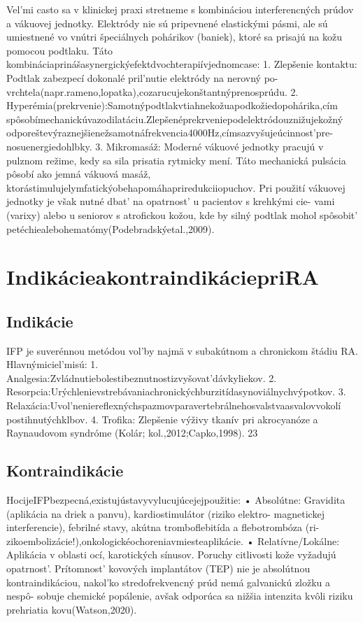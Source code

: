 Vel’mi casto sa v klinickej praxi stretneme s kombináciou interferencných prúdov a vákuovej jednotky. Elektródy nie sú pripevnené elastickými pásmi, ale sú umiestnené vo vnútri špeciálnych pohárikov (baniek), ktoré sa prisajú na kožu pomocou podtlaku. Táto kombináciaprinášasynergickýefektdvochterapiívjednomcase: 1. Zlepšenie kontaktu: Podtlak zabezpecí dokonalé pril’nutie elektródy na nerovný po- vrchtela(napr.rameno,lopatka),cozarucujekonštantnýprenosprúdu. 2. Hyperémia(prekrvenie):Samotnýpodtlakvtiahnekožuapodkožiedopohárika,cím spôsobímechanickúvazodilatáciu.Zlepšenéprekrveniepodelektródouznižujekožný odporeštevýraznejšienežsamotnáfrekvencia4000Hz,címsazvyšujeúcinnost’pre- nosuenergiedohlbky. 3. Mikromasáž: Moderné vákuové jednotky pracujú v pulznom režime, kedy sa sila prisatia rytmicky mení. Táto mechanická pulsácia pôsobí ako jemná vákuová masáž, ktorástimulujelymfatickýobehapomáhapriredukciiopuchov. Pri použití vákuovej jednotky je však nutné dbat’ na opatrnost’ u pacientov s krehkými cie- vami (varixy) alebo u seniorov s atrofickou kožou, kde by silný podtlak mohol spôsobit’ petéchiealebohematómy(Podebradskýetal.,2009).


\section{IndikácieakontraindikáciepriRA}

\subsection{Indikácie}

IFP je suverénnou metódou vol’by najmä v subakútnom a chronickom štádiu RA. Hlavnýmiciel’misú: 1. Analgesia:Zvládnutiebolestibeznutnostizvyšovat’dávkyliekov. 2. Resorpcia:Urýchlenievstrebávaniachronickýchburzitídasynoviálnychvýpotkov. 3. Relaxácia:Uvol’neniereflexnýchspazmovparavertebrálnehosvalstvaasvalovvokolí postihnutýchklbov. 4. Trofika: Zlepšenie výživy tkanív pri akrocyanóze a Raynaudovom syndróme (Kolár; kol.,2012;Capko,1998). 23


\subsection{Kontraindikácie}

HocijeIFPbezpecná,existujústavyvylucujúcejejpoužitie: • Absolútne: Gravidita (aplikácia na driek a panvu), kardiostimulátor (riziko elektro- magnetickej interferencie), febrilné stavy, akútna tromboflebitída a flebotrombóza (ri- zikoembolizácie!),onkologickéochoreniavmiesteaplikácie. • Relatívne/Lokálne: Aplikácia v oblasti ocí, karotických sínusov. Poruchy citlivosti kože vyžadujú opatrnost’. Prítomnost’ kovových implantátov (TEP) nie je absolútnou kontraindikáciou, nakol’ko stredofrekvencný prúd nemá galvanickú zložku a nespô- sobuje chemické popálenie, avšak odporúca sa nižšia intenzita kvôli riziku prehriatia kovu(Watson,2020).



